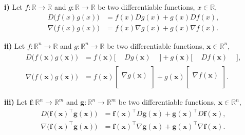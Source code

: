\documentclass[12pt,thmsa]{article}
\begin{document}
\textbf{i)} Let \(f: \mathbb{R} \rightarrow \mathbb{R}\) and \(g: \mathbb{R} \rightarrow \mathbb{R}\) be two differentiable functions, \(x \in \mathbb{R}\),
\[ 
\begin{aligned}
	D \bigg (f(x) g(x) \bigg )
	& = f(x)  D g(x)
	+g(x)  D f(x),  \\
	\nabla \bigg (f(x) g(x) \bigg )
	& = f(x)  \nabla g(x)
	+g(x)  \nabla f(x). 
\end{aligned}
\]

\noindent
\textbf{ii)} Let \(f: \mathbb{R}^{n} \rightarrow \mathbb{R}\) and \(g: \mathbb{R}^{n} \rightarrow \mathbb{R}\) be two differentiable functions, \(\boldsymbol{x} \in \mathbb{R}^{n}\),
\[ 
\begin{aligned}
	D \bigg (f(\boldsymbol{x}) g(\boldsymbol{x}) \bigg )
	& = f(\boldsymbol{x}) \big [\begin{array}{ccc}
		&D g(\boldsymbol{x}) & \end{array} \big ] 
	+g(\boldsymbol{x}) \big [\begin{array}{ccc} & D f(\boldsymbol{x}) &
	\end{array} \big ], \\
	\nabla \bigg (f(\boldsymbol{x}) g(\boldsymbol{x}) \bigg )
	& = f(\boldsymbol{x}) \left [\begin{array}{c}
		\\ \nabla g(\boldsymbol{x}) \\  \\ \end{array} \right ] 
	+g(\boldsymbol{x}) \left [\begin{array}{c} \\ \nabla f(\boldsymbol{x}) \\ \\
	\end{array} \right ].
\end{aligned}
\]

\noindent
\textbf{iii)} Let \( \boldsymbol{f}: \mathbb{R}^{n} \rightarrow \mathbb{R}^{m}\) and \( \boldsymbol{g}: \mathbb{R}^{n} \rightarrow \mathbb{R}^{m}\) be two differentiable functions, \(\boldsymbol{x} \in \mathbb{R}^{n}\),
\[ 
\begin{aligned}
	D \bigg (\boldsymbol{f}(\boldsymbol{x})^{\top} \boldsymbol{g}(\boldsymbol{x}) \bigg )
	& =\boldsymbol{f}(\boldsymbol{x})^{\top} D \boldsymbol{g}(\boldsymbol{x})+\boldsymbol{g}(\boldsymbol{x})^{\top} D \boldsymbol{f}(\boldsymbol{x}), \\
	\nabla \bigg (\boldsymbol{f}(\boldsymbol{x})^{\top} \boldsymbol{g}(\boldsymbol{x}) \bigg )
	& =\boldsymbol{f}(\boldsymbol{x})^{\top} \nabla \boldsymbol{g}(\boldsymbol{x})+\boldsymbol{g}(\boldsymbol{x})^{\top} \nabla \boldsymbol{f}(\boldsymbol{x}). \\
\end{aligned}
\]
\end{document}
